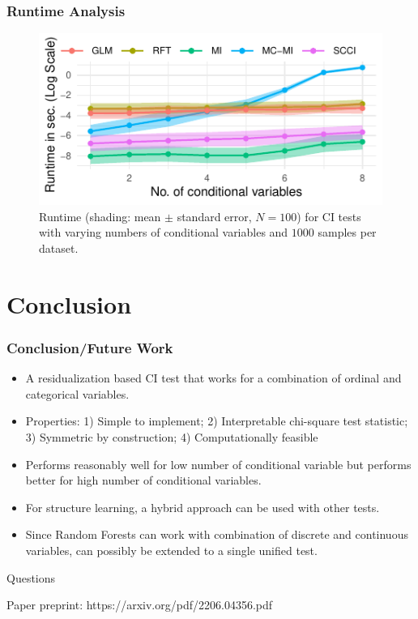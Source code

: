 \documentclass{beamer}
\begin{document}
\begin{frame}
	\frametitle{Runtime Analysis}
	\begin{figure}
		\centering
		\includegraphics{imgs/runtime.pdf}
		\caption*{Runtime (shading: mean $\pm$ standard error, $N=100$)
		for CI tests with varying numbers of conditional variables and
		$1000$ samples per dataset.
		}
	\end{figure}
\end{frame}

\section{Conclusion}
\begin{frame}
	\frametitle{Conclusion/Future Work}
	\begin{itemize}
		\setlength\itemsep{1em}
		\item A residualization based CI test that works for a combination of ordinal and categorical variables.
		\item Properties: 1) Simple to implement; 2) Interpretable chi-square test statistic; 3) Symmetric by construction; 4) Computationally feasible
		\item Performs reasonably well for low number of
			conditional variable but performs better for high
			number of conditional variables.
		\item For structure learning, a hybrid approach can be used with other
			tests.
		\item Since Random Forests can work with combination of discrete and 
			continuous variables, can possibly be extended to a single 
			unified test.
	\end{itemize}
\end{frame}

\begin{frame}
	\begin{center}
		\Huge{Questions}
	\end{center}
	\begin{center}
		Paper preprint: https://arxiv.org/pdf/2206.04356.pdf
	\end{center}
\end{frame}
\end{document}
